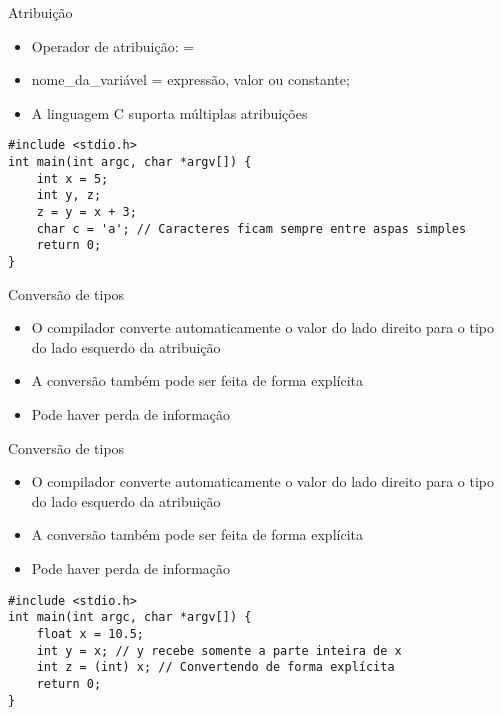 \documentclass[t, aspectratio=169]{beamer}
\begin{document}
\begin{frame}[label={sec:org829c141},fragile]{Atribuição}
 \begin{itemize}
\item Operador de atribuição: \alert{=}
\item \alert{\color{highlight}nome\_da\_variável \color{black}= \color{blue!80}expressão, valor ou constante;}
\item A linguagem C suporta múltiplas atribuições
\end{itemize}

\begin{verbatim}
#include <stdio.h>
int main(int argc, char *argv[]) {
    int x = 5;
    int y, z;
    z = y = x + 3;
    char c = 'a'; // Caracteres ficam sempre entre aspas simples
    return 0;
}
\end{verbatim}
\end{frame}

\begin{frame}[label={sec:orge28b309}]{Conversão de tipos}
\begin{itemize}
\item O compilador converte automaticamente o valor do lado direito para o
tipo do lado esquerdo da atribuição
\item A conversão também pode ser feita de forma explícita
\item \alert{Pode haver perda de informação}
\end{itemize}
\end{frame}

\begin{frame}[label={sec:org28f087f},fragile]{Conversão de tipos}
 \begin{itemize}
\item O compilador converte automaticamente o valor do lado direito para o
tipo do lado esquerdo da atribuição
\item A conversão também pode ser feita de forma explícita
\item \alert{Pode haver perda de informação}
\end{itemize}

\begin{verbatim}
#include <stdio.h>
int main(int argc, char *argv[]) {
    float x = 10.5;
    int y = x; // y recebe somente a parte inteira de x
    int z = (int) x; // Convertendo de forma explícita
    return 0;
}
\end{verbatim}
\end{frame}
\end{document}
